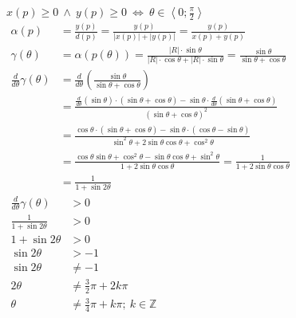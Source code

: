 \item $x\left(p\right) \geqslant 0 \ \wedge \  y\left(p\right) \geqslant 0 \ \Leftrightarrow \ \theta \in \left\langle 0;\frac{\pi}{2}\right\rangle$
  		\begin{align*}
        	\alpha\left( p\right) & = \frac{
        		y\left(p\right)
        	}{
        		d\left(p\right)
        	} = \frac{
        		y\left(p\right)
        	}{
        		\left|x\left(p\right)\right| + \left|y\left(p\right)\right|
        	} = \frac{
        		y\left(p\right)
        	}{
        		x\left(p\right) + y\left(p\right)
        	} & \hspace{10cm}\\
        	\gamma\left( \theta\right) & = \alpha\left( p\left(\theta\right) \right) = \frac{
        		\left|R\right| \cdot \sin \theta
        	}{
        		\left|R\right| \cdot \cos \theta + \left|R\right| \cdot \sin \theta
        	} =\frac{
        		\sin \theta
        	}{
        		\sin \theta + \cos \theta
        	} \\
        	\frac{
        		d
        	}{
        		d\theta
        	}\gamma\left( \theta\right) & = \frac{
        		d
        	}{
        		d\theta
        	}\left(
        		\frac{ 
        			\sin \theta
        		}{
        			\sin \theta + \cos \theta
        		}
        	\right) \\ 
        	& =\frac{
        		\frac{
        			d
        		}{
        			d\theta
        		}\left(
        			\sin\theta
        		\right)\cdot\left(
        			\sin \theta + \cos \theta
        		\right)
        		-\sin\theta\cdot\frac{
        			d
        		}{
        			d\theta
        		}\left(\sin \theta + \cos \theta\right)
        	}{
        		\left(
        			\sin \theta + \cos \theta
        		\right)^2
        	}\\
        	& =\frac{
        		\cos\theta\cdot\left(\sin \theta + \cos \theta\right)
        		-\sin\theta\cdot\left(\cos \theta - \sin \theta\right)
        	}{
        		\sin^2 \theta + 2\sin\theta\cos\theta + \cos^2 \theta 
        	}\\
        	& =\frac{
        		\cos\theta\sin \theta + \cos^2 \theta
        		-\sin\theta\cos \theta  + \sin^2 \theta
        	}{
        		1 + 2\sin\theta\cos\theta
        	} = \frac{
        		1
        	}{
        		1 + 2\sin\theta\cos\theta
        	} \\
        	& = \frac{
        		1
        	}{
        		1 + \sin 2\theta
        	} 
        \end{align*}
        \begin{align*}
        	\frac{d}{d\theta}\gamma\left( \theta\right)& > 0& \hspace{10cm}\\
        	\frac{
        		1
        	}{
        		1 + \sin 2\theta
        	} & > 0\\
        	1 + \sin 2\theta & > 0\\
        	 \sin 2\theta & > -1\\
        	 \sin 2\theta & \neq -1\\
        	 2\theta & \neq \frac{3}{2}\pi + 2k\pi\\
        	 \theta & \neq \frac{3}{4}\pi + k\pi ; \ k \in \mathbb{Z}
        \end{align*}
